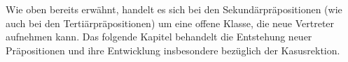 Wie oben bereits erwähnt, handelt es sich bei den Sekundärpräpositionen (wie auch bei den Tertiärpräpositionen) um eine offene Klasse, die neue Vertreter aufnehmen kann. 
Das folgende Kapitel behandelt die Entstehung neuer Präpositionen und ihre Entwicklung insbesondere bezüglich der Kasusrektion. 
